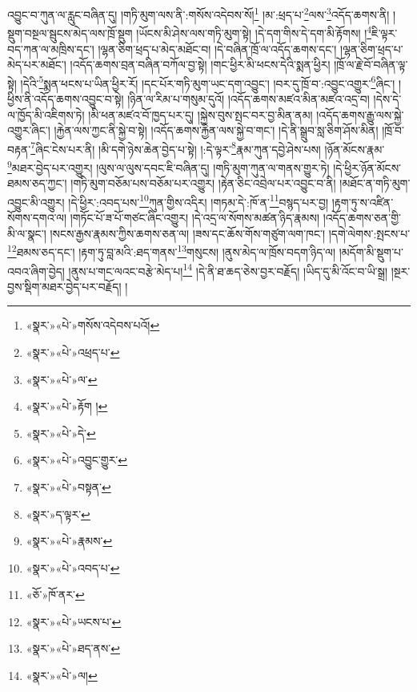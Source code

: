 འབྱུང་བ་ཀུན་ལ་རླུང་བཞིན་དུ། །གཏི་མུག་ལས་ནི་:གསོས་འདེབས་སོ།\footnote{«སྣར་»«པེ་»གསོས་འདེབས་པའོ།} །མ་:ཕྲད་པ་\footnote{«སྣར་»«པེ་»འཕྲད་པ་}ལས་\footnote{«སྣར་»«པེ་»ལ་}འདོད་ཆགས་ནི། །སྡུག་བསྔལ་སྦུངས་མེད་ལས་ཁྲོ་སྡུག །ཡོངས་མི་ཤེས་ལས་གཏི་མུག་སྟེ། །དེ་དག་གིས་དེ་དག་མི་རྟོགས། །\footnote{«སྣར་»«པེ་»རྟོག །}ཇི་ལྟར་བད་ཀན་ལ་མཁྲིས་དང་། །ལྷན་ཅིག་ཕྲད་པ་མེད་མཐོང་བ། །དེ་བཞིན་ཁྲོ་ལ་འདོད་ཆགས་དང་། །ལྷན་ཅིག་ཕྲད་པ་མེད་པར་མཐོང་། །འདོད་ཆགས་བྲན་བཞིན་བཀོལ་བྱ་སྟེ། །གང་ཕྱིར་མི་ཕངས་དེའི་སྨན་ཕྱིར། །ཁྲོ་ལ་རྗེ་བོ་བཞིན་ལྟ་སྟེ། །དེའི་\footnote{«སྣར་»«པེ་»དེ་}སྨན་ཕངས་པ་ཡིན་ཕྱིར་རོ། །དང་པོར་གཏི་མུག་ཡང་དག་འབྱུང་། །བར་དུ་ཁྲོ་བ་:འབྱུང་འགྱུར་\footnote{«སྣར་»«པེ་»འབྱུང་གྱུར་}ཞིང་། །ཕྱིས་ནི་འདོད་ཆགས་འབྱུང་བ་སྟེ། །ཉིན་ལ་རིམ་པ་གསུམ་དུའོ། །འདོད་ཆགས་མཛའ་མིན་མཛའ་འདྲ་བ། །དེས་དེ་ལ་ཁྱོད་མི་འཇིགས་ཏེ། །མི་ཕན་མཛའ་བོ་ཁྱད་པར་དུ། །སྐྱེས་བུས་སྤང་བར་བྱ་མིན་ནམ། །འདོད་ཆགས་རྒྱུ་ལས་སྐྱེ་འགྱུར་ཞིང་། །རྐྱེན་ལས་ཀྱང་ནི་སྐྱེ་བ་སྟེ། །འདོད་ཆགས་རྐྱེན་ལས་སྐྱེ་བ་གང་། །དེ་ནི་སྒྲུབ་སླ་ཅིག་ཤོས་མིན། །ཁྲོ་བ་བརྟན་\footnote{«སྣར་»«པེ་»བསྟན་}ཞིང་ངེས་པར་ནི། །མི་དགེ་ཉེས་ཆེན་བྱེད་པ་སྟེ། །:དེ་ལྟར་\footnote{«སྣར་»ད་ལྟར་}རྣམ་ཀུན་དབྱེ་ཤེས་པས། །ཉོན་མོངས་རྣམ་\footnote{«སྣར་»«པེ་»རྣམས་}མཐར་བྱེད་པར་འགྱུར། །ལུས་ལ་ལུས་དབང་ཇི་བཞིན་དུ། །གཏི་མུག་ཀུན་ལ་གནས་གྱུར་ཏེ། །དེ་ཕྱིར་ཉོན་མོངས་ཐམས་ཅད་ཀྱང་། །གཏི་མུག་བཅོམ་པས་བཅོམ་པར་འགྱུར། །རྟེན་ཅིང་འབྲེལ་པར་འབྱུང་བ་ནི། །མཐོང་ན་གཏི་མུག་འབྱུང་མི་འགྱུར། །དེ་ཕྱིར་:འབད་པས་\footnote{«སྣར་»«པེ་»འབད་པ་}ཀུན་གྱིས་འདིར། །གཏམ་དེ་:ཁོ་ན་\footnote{«ཅོ་»ཁོ་ནར་}བསྙད་པར་བྱ། །རྟག་ཏུ་ས་འཛིན་སོགས་དགའ་ལ། །གཏོང་པོ་ཟ་པོ་གཙང་ཞིང་འགྱུར། །དེ་འདྲ་ལ་སོགས་མཚན་ཉིད་རྣམས། །འདོད་ཆགས་ཅན་གྱི་མི་ལ་སྣང་། །སངས་རྒྱས་རྣམས་ཀྱིས་ཆགས་ཅན་ལ། །ཟས་དང་ཆོས་གོས་གཙུག་ལག་ཁང་། །དགེ་ལེགས་:སྤངས་པ་\footnote{«སྣར་»«པེ་»ཡངས་པ་}ཐམས་ཅད་དང་། །རྟག་ཏུ་བླ་མའི་:ཐད་གནས་\footnote{«སྣར་»«པེ་»ཐད་ནས་}གསུངས། །ནུས་མེད་ལ་ཁྲོས་བདག་ཉིད་ལ། །མདོག་མི་སྡུག་པ་འབའ་ཞིག་བྱེད། །ནུས་པ་གང་ལའང་བརྩེ་མེད་པ།\footnote{«སྣར་»«པེ་»ལ།} །དེ་ནི་ཐ་ཆད་ཅེས་བྱར་བརྗོད། །ཡིད་དུ་མི་འོང་བ་ཡི་སྒྲ། །སྔར་བྱས་སྡིག་མཐར་བྱེད་པར་བརྗོད། །
